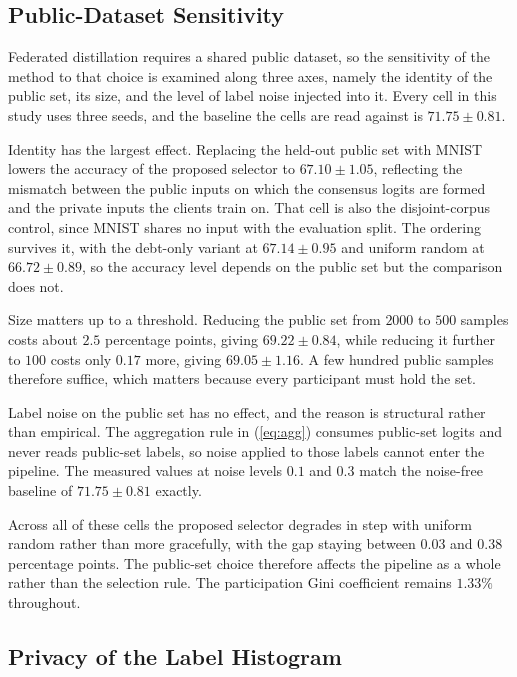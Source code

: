 \documentclass[journal]{IEEEtran}
\newcommand{\rev}[1]{{\color{blue}#1}}
\begin{document}
\subsection{Public-Dataset Sensitivity}
\label{ssec:exp-publicset}

\rev{Federated distillation requires a shared public dataset, so the sensitivity of the method to that choice is examined along three axes, namely the identity of the public set, its size, and the level of label noise injected into it. Every cell in this study uses three seeds, and the baseline the cells are read against is $71.75 \pm 0.81$.}

\rev{Identity has the largest effect. Replacing the held-out public set with MNIST lowers the accuracy of the proposed selector to $67.10 \pm 1.05$, reflecting the mismatch between the public inputs on which the consensus logits are formed and the private inputs the clients train on. That cell is also the disjoint-corpus control, since MNIST shares no input with the evaluation split. The ordering survives it, with the debt-only variant at $67.14 \pm 0.95$ and uniform random at $66.72 \pm 0.89$, so the accuracy level depends on the public set but the comparison does not.}

\rev{Size matters up to a threshold. Reducing the public set from $2000$ to $500$ samples costs about $2.5$ percentage points, giving $69.22 \pm 0.84$, while reducing it further to $100$ costs only $0.17$ more, giving $69.05 \pm 1.16$. A few hundred public samples therefore suffice, which matters because every participant must hold the set.}

\rev{Label noise on the public set has no effect, and the reason is structural rather than empirical. The aggregation rule in (\ref{eq:agg}) consumes public-set logits and never reads public-set labels, so noise applied to those labels cannot enter the pipeline. The measured values at noise levels $0.1$ and $0.3$ match the noise-free baseline of $71.75 \pm 0.81$ exactly.}

\rev{Across all of these cells the proposed selector degrades in step with uniform random rather than more gracefully, with the gap staying between $0.03$ and $0.38$ percentage points. The public-set choice therefore affects the pipeline as a whole rather than the selection rule. The participation Gini coefficient remains $1.33\%$ throughout.}

\subsection{Privacy of the Label Histogram}
\label{ssec:exp-privacy}
\end{document}

